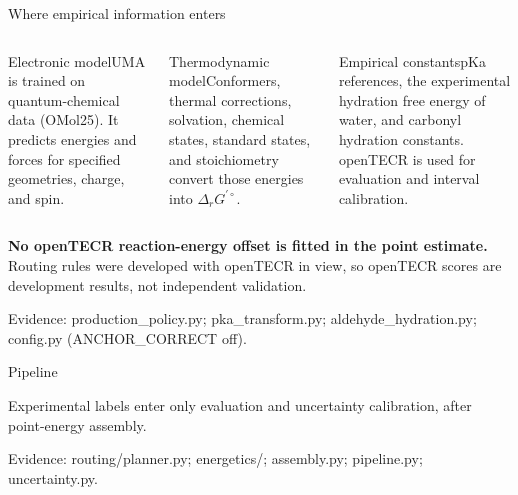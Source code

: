 \documentclass[aspectratio=169,11pt]{beamer}
\newcommand{\src}[1]{\vfill{\tiny\color{muted}Evidence: #1\par}}
\newcommand{\dg}{\Delta_r G^{\prime\circ}}
\newcommand{\gap}{\vspace{.18cm}}
\begin{document}
\begin{frame}{Where empirical information enters}
\begin{columns}[T]
\begin{block}{Electronic model}\small UMA is trained on quantum-chemical data (OMol25). It predicts energies and forces for specified geometries, charge, and spin.\end{block}
\begin{block}{Thermodynamic model}\small Conformers, thermal corrections, solvation, chemical states, standard states, and stoichiometry convert those energies into $\dg$.\end{block}
\begin{block}{Empirical constants}\small pKa references, the experimental hydration free energy of water, and carbonyl hydration constants. openTECR is used for evaluation and interval calibration.\end{block}
\end{columns}
\gap
\textbf{No openTECR reaction-energy offset is fitted in the point estimate.}
\gap
Routing rules were developed with openTECR in view, so openTECR scores are development results, not independent validation.
\src{production\_policy.py; pka\_transform.py; aldehyde\_hydration.py; config.py (ANCHOR\_CORRECT off).}
\end{frame}

\begin{frame}{Pipeline}
\centering
{}
\gap
\gap\small Experimental labels enter only evaluation and uncertainty calibration, after point-energy assembly.
\src{routing/planner.py; energetics/; assembly.py; pipeline.py; uncertainty.py.}
\end{frame}
\end{document}
